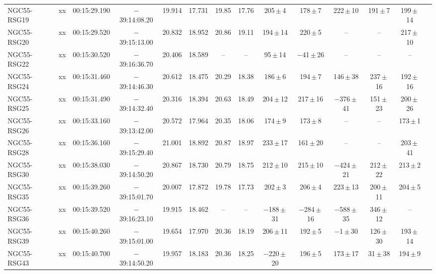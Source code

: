 \begin{table}
\begin{threeparttable}
\begin{tabular}{lrcccccccccccl}
 \hline
NGC55-RSG19 & xx & 00:15:29.190 & $-$39:14:08.20& 19.914 & 17.731 &19.85 & 17.76 &   205\,$\pm$\,4  &  178\,$\pm$\,7   &    222\,$\pm$\,10 &   191\,$\pm$\,7               & 199\,$\pm$\,14 & \\
NGC55-RSG20 & xx & 00:15:29.520 & $-$39:15:13.00& 20.832 & 18.952 &20.86 & 19.11 &   194\,$\pm$\,14 &  220\,$\pm$\,5   & -- & --                                           & 217\,$\pm$\,10 & \\
NGC55-RSG22 & xx & 00:15:30.520 & $-$39:16:36.70& 20.406 & 18.589 & --   & --    &    95\,$\pm$\,14 &$-$41\,$\pm$\,26  & -- & --                                           & --             & \\
NGC55-RSG24 & xx & 00:15:31.460 & $-$39:14:46.30& 20.612 & 18.475 &20.29 & 18.38 &   186\,$\pm$\,6  &  194\,$\pm$\,7   &    146\,$\pm$\,38 &   237\,$\pm$\,16              & 192\,$\pm$\,16 & \\
NGC55-RSG25 & xx & 00:15:31.490 & $-$39:14:32.40& 20.316 & 18.394 &20.63 & 18.49 &   204\,$\pm$\,12 &  217\,$\pm$\,16  & $-$376\,$\pm$\,41\tnote{c} & 151\,$\pm$\,23       & 200\,$\pm$\,26 & \\
NGC55-RSG26 & xx & 00:15:33.160 & $-$39:13:42.00& 20.572 & 17.964 &20.35 & 18.06 &   174\,$\pm$\,9  &  173\,$\pm$\,8   & -- & --                                           & 173\,$\pm$\,1  & \\
NGC55-RSG28 & xx & 00:15:36.160 & $-$39:15:29.40& 21.001 & 18.892 &20.87 & 18.97 &   233\,$\pm$\,17 &  161\,$\pm$\,20  & -- & --                                           & 203\,$\pm$\,41 & \\
NGC55-RSG30 & xx & 00:15:38.030 & $-$39:14:50.20& 20.867 & 18.730 &20.79 & 18.75 &   212\,$\pm$\,10 &  215\,$\pm$\,10  & $-$424\,$\pm$\,21\tnote{c} & 212\,$\pm$\,22       & 213\,$\pm$\,2  & \\
NGC55-RSG35 & xx & 00:15:39.260 & $-$39:15:01.70& 20.007 & 17.872 &19.78 & 17.73 &   202\,$\pm$\,3  &  206\,$\pm$\,4   &    223\,$\pm$\,13 &   200\,$\pm$\,11              & 204\,$\pm$\,5  & \\
NGC55-RSG36 & xx & 00:15:39.520 & $-$39:16:23.10& 19.915 & 18.462 & --   & --    &$-$188\,$\pm$\,31 &$-$284\,$\pm$\,16 & $-$588\,$\pm$\,35 &   346\,$\pm$\,12              & --             & \\
NGC55-RSG39 & xx & 00:15:40.260 & $-$39:15:01.00& 19.654 & 17.970 &20.36 & 18.19 &   206\,$\pm$\,11 &  192\,$\pm$\,5&$-$1\,$\pm$\,30\tnote{c}& 126\,$\pm$\,30              & 193\,$\pm$\,14 & \\
NGC55-RSG43 & xx & 00:15:40.700 & $-$39:14:50.20& 19.957 & 18.183 &20.36 & 18.25 &$-$220\,$\pm$\,20\tnote{c}&196\,$\pm$\,5& 173\,$\pm$\,17 &    31\,$\pm$\,38\tnote{c}     & 194\,$\pm$\,9  & \\

\end{tabular}
\end{threeparttable}
\end{table}
